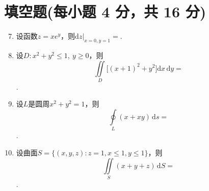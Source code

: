 \documentclass[../Main.tex]{subfiles}
\begin{document}
\section{填空题(每小题 4 分，共 16 分)}
\begin{enumerate}
    \setcounter{enumi}{6}
    \item 设函数$z=xe^{y}$，则$\mathrm{d}z|_{x=0,y=1}=$\underline{\hspace{3cm}}.

    \item 设$D:x^{2}+y^{2}\leq1,\ y\geq0$，则
          \[
              \iint\limits_{D}\bigl[(x+1)^{2}+y^{2}\bigr]\mathrm{d}x\,\mathrm{d}y=
          \]
          \underline{\hspace{3cm}}.

    \item 设$L$是圆周$x^{2}+y^{2}=1$，则
          \[
              \oint\limits_{L}(x+xy)\,\mathrm{d}s=
          \]
          \underline{\hspace{3cm}}.

    \item 设曲面$S=\{(x,y,z):z=1,x\leq1,y\leq1\}$，则
          \[
              \iint\limits_{S}(x+y+z)\,\mathrm{d}S=
          \]
          \underline{\hspace{3cm}}.
\end{enumerate}
\end{document}
